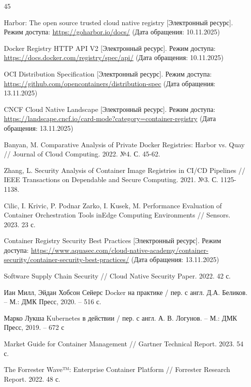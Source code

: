 \begin{thebibliography}{45}
	
	 Harbor: The open source trusted cloud native registry [Электронный ресурс]. Режим доступа: \url{https://goharbor.io/docs/} (Дата обращения: 10.11.2025)
	
	 Docker Registry HTTP API V2 [Электронный ресурс]. Режим доступа: \url{https://docs.docker.com/registry/spec/api/} (Дата обращения: 10.11.2025)
	
	 OCI Distribution Specification [Электронный ресурс]. Режим доступа: \url{https://github.com/opencontainers/distribution-spec} (Дата обращения: 13.11.2025)
	
	 CNCF Cloud Native Landscape [Электронный ресурс]. Режим доступа: \url{https://landscape.cncf.io/card-mode?category=container-registry} (Дата обращения: 13.11.2025)
	
	 Banyan, M. Comparative Analysis of Private Docker Registries: Harbor vs. Quay // Journal of Cloud Computing. 2022. №4. С. 45-62.
	
	 Zhang, L. Security Analysis of Container Image Registries in CI/CD Pipelines // IEEE Transactions on Dependable and Secure Computing. 2021. №3. С. 1125-1138.
	
	 Cilic, I. Krivic, P. Podnar Zarko, I. Kusek, M. Performance Evaluation of Container Orchestration Tools inEdge Computing Environments // Sensors. 2023. 23 с.
	
	 Container Registry Security Best Practices [Электронный ресурс]. Режим доступа: \url{https://www.aquasec.com/cloud-native-academy/container-security/container-security-best-practices/} (Дата обращения: 13.11.2025)
	
	 Software Supply Chain Security // Cloud Native Security Paper. 2022. 42 с.
	
	 Иан Милл, Эйдан Хобсон Сейерс Docker на практике / пер. с англ. Д.А. Беликов. – М.: ДМК  Пресс, 2020. – 516 с.
	
	 Марко Лукша Kubernetes в действии / пер. с англ. А. В. Логунов. – М.: ДМК Пресс, 2019. –
	672 с
	
	 Market Guide for Container Management // Gartner Technical Report. 2023. 54 с.
	
	 The Forrester Wave™: Enterprise Container Platform // Forrester Research Report. 2022. 48 с.
	

\end{thebibliography}
